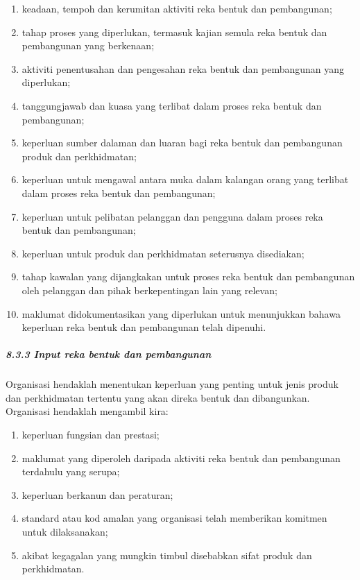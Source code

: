 \documentclass[
]{article}
\begin{document}
\begin{enumerate}
\def\labelenumi{\alph{enumi})}
\item
  keadaan, tempoh dan kerumitan aktiviti reka bentuk dan pembangunan;
\item
  tahap proses yang diperlukan, termasuk kajian semula reka bentuk dan
  pembangunan yang berkenaan;
\item
  aktiviti penentusahan dan pengesahan reka bentuk dan pembangunan yang
  diperlukan;
\item
  tanggungjawab dan kuasa yang terlibat dalam proses reka bentuk dan
  pembangunan;
\item
  keperluan sumber dalaman dan luaran bagi reka bentuk dan pembangunan
  produk dan perkhidmatan;
\item
  keperluan untuk mengawal antara muka dalam kalangan orang yang
  terlibat dalam proses reka bentuk dan pembangunan;
\item
  keperluan untuk pelibatan pelanggan dan pengguna dalam proses reka
  bentuk dan pembangunan;
\item
  keperluan untuk produk dan perkhidmatan seterusnya disediakan;
\item
  tahap kawalan yang dijangkakan untuk proses reka bentuk dan
  pembangunan oleh pelanggan dan pihak berkepentingan lain yang relevan;
\item
  maklumat didokumentasikan yang diperlukan untuk menunjukkan bahawa
  keperluan reka bentuk dan pembangunan telah dipenuhi.
\end{enumerate}

\hypertarget{input-reka-bentuk-dan-pembangunan}{%
\subparagraph{8.3.3 Input reka bentuk dan
pembangunan}\label{input-reka-bentuk-dan-pembangunan}}

Organisasi hendaklah menentukan keperluan yang penting untuk jenis
produk dan perkhidmatan tertentu yang akan direka bentuk dan
dibangunkan. Organisasi hendaklah mengambil kira:

\begin{enumerate}
\def\labelenumi{\alph{enumi})}
\item
  keperluan fungsian dan prestasi;
\item
  maklumat yang diperoleh daripada aktiviti reka bentuk dan pembangunan
  terdahulu yang serupa;
\item
  keperluan berkanun dan peraturan;
\item
  standard atau kod amalan yang organisasi telah memberikan komitmen
  untuk dilaksanakan;
\item
  akibat kegagalan yang mungkin timbul disebabkan sifat produk dan
  perkhidmatan.
\end{enumerate}
\end{document}
